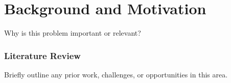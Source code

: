 \section{Background and Motivation}
Why is this problem important or relevant?

\subsubsection{Literature Review}
    
Briefly outline any prior work, challenges, or opportunities in this area.